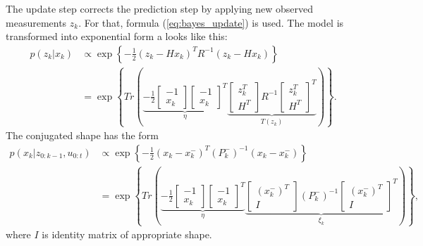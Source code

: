 The update step corrects the prediction step by applying new observed measurements $z_k$. For that, formula (\ref{eq:bayes_update}) is used. The model is transformed into exponential form a looks like this:
\begin{align}
    p(z_k|x_k) &\propto \exp \left\{-\frac{1}{2}(z_k - Hx_k)^T R^{-1} (z_k - Hx_k)\right \} \nonumber \\
    &= \exp
    \left\{
        Tr\left(
        \underbrace{
            -\frac{1}{2}
            \begin{bmatrix}
                -1 \\
                x_k
            \end{bmatrix}
            \begin{bmatrix}
                -1 \\
                x_k
            \end{bmatrix}^T
        }_{\eta}
        \underbrace{
            \begin{bmatrix}
                z_k^T \\
                H^T
            \end{bmatrix}
            R^{-1}
            \begin{bmatrix}
                z_k^T \\
                H^T
            \end{bmatrix}^T
        }_{T(z_k)}
        \right)
    \right\}.
\end{align}
The conjugated shape has the form
\begin{align}
    p(x_k|z_{0:k-1}, u_{0:t}) &\propto \exp
    \left\{-\frac{1}{2}(x_k - x_k^-)^T (P_k^-)^{-1} (x_k - x_k^-)\right \} \nonumber \\
    &= \exp
    \left\{
    Tr\left(
    \underbrace{
        -\frac{1}{2}
        \begin{bmatrix}
            -1 \\
            x_k
        \end{bmatrix}
        \begin{bmatrix}
            -1 \\
            x_k
        \end{bmatrix}^T
    }_{\eta}
    \underbrace{
        \begin{bmatrix}
            (x_k^-)^T \\
            I
        \end{bmatrix}
        (P_k^-)^{-1}
        \begin{bmatrix}
            (x_k^-)^T \\
            I
        \end{bmatrix}^T
    }_{\xi_k}
    \right)
    \right\},
\end{align}
where $I$ is identity matrix of appropriate shape.

